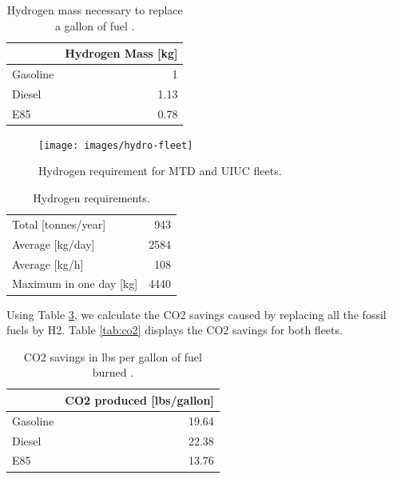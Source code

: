 \documentclass[11pt,letterpaper]{article}
\begin{document}
    \column[t]{5cm}
	\begin{table}[!htb]
		\centering
	    \caption{Hydrogen mass necessary to replace a gallon of fuel \cite{doe_office_of_energy_efficiency_and_renewable_energy_hydrogen_2020} \cite{alternative_fuels_data_center_fuel_2014}.}
		\begin{tabular}{lr}
		\hline
		                 & Hydrogen Mass [kg] \\ \hline
		Gasoline         & 1                  \\
		Diesel           & 1.13               \\
		E85              & 0.78               \\ \hline
        \end{tabular}
        \label{tab:equiv}
	\end{table}

	\begin{figure}[htbp!]
	    \centering
		\texttt{[image: images/hydro-fleet]}
		\hfill
		\caption{Hydrogen requirement for MTD and UIUC fleets.}
		\label{fig:hydro-fleet}
	\end{figure}

	\begin{table}[!htb]
		\centering
	    \caption{Hydrogen requirements.}
		\begin{tabular}{lr}
		\hline
		Total [tonnes/year]     & 943    \\
		Average [kg/day] 	    & 2584   \\
		Average [kg/h] 		    & 108    \\
		Maximum in one day [kg] & 4440   \\ \hline
        \end{tabular}
        \label{tab:hydro-fleet}
	\end{table}

Using Table \ref{tab:co2-eq}, we calculate the \gls{CO2} savings caused by replacing all the fossil fuels by \gls{H2}.
Table \ref{tab:co2} displays the \gls{CO2} savings for both fleets.

    \column[t]{5cm}
	\begin{table}[!htb]
		\centering
	    \caption{\gls{CO2} savings in lbs per gallon of fuel burned \cite{energy_information_administration_how_2014}.}
		\begin{tabular}{lr}
		\hline
		              & \gls{CO2} produced [lbs/gallon] \\ \hline
		Gasoline      & 19.64           \\
		Diesel        & 22.38           \\
		E85           & 13.76           \\ \hline
        \end{tabular}
        \label{tab:co2-eq}
	\end{table}
\end{document}
